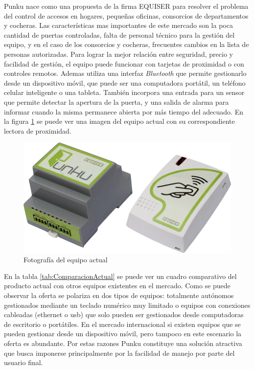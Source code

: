 Punku nace como una propuesta de la firma EQUISER para resolver el problema del control de accesos en hogares, pequeñas oficinas, consorcios de departamentos y cocheras. Las características mas importantes de este mercado son la poca cantidad de puertas controladas, falta de personal técnico para la gestión del equipo, y en el caso de los consorcios y cocheras, frecuentes cambios en la lista de personas autorizadas. Para lograr la mejor relación entre seguridad, precio y facilidad de gestión, el equipo puede funcionar con tarjetas de proximidad o con controles remotos. Ademas utiliza una interfaz \emph{Bluetooth} que permite gestionarlo desde un dispositivo móvil, que puede ser una computadora portátil, un teléfono celular inteligente o una tableta. También incorpora una entrada para un sensor que permite detectar la apertura de la puerta, y una salida de alarma para informar cuando la misma permanece abierta por más tiempo del adecuado. En la figura \ref{fig:EquipoActual} se puede ver una imagen del equipo actual con su correspondiente lectora de proximidad.

\begin{figure}[ht]
	\centering
	\vspace{3mm}
	\includegraphics[scale=.5]{./Figures/EquipoActual.png}
	\caption{Fotografía del equipo actual}
	\label{fig:EquipoActual}
\end{figure}

En la tabla \ref{tab:ComparacionActual} se puede ver un cuadro comparativo del producto actual con otros equipos existentes en el mercado. Como se puede observar la oferta se polariza en dos tipos de equipos: totalmente autónomos gestionados mediante un teclado numérico muy limitado o equipos con conexiones cableadas (ethernet o usb) que solo pueden ser gestionados desde computadoras de escritorio o portátiles. En el mercado internacional si existen equipos que se pueden gestionar desde un dispositivo móvil, pero tampoco en este escenario la oferta es abundante. Por estas razones Punku constituye una solución atractiva que busca imponerse principalmente por la facilidad de manejo por parte del usuario final. 


